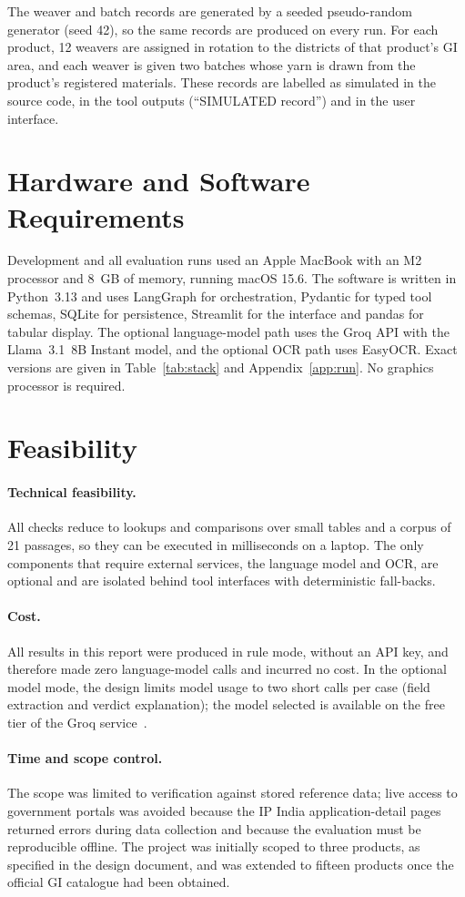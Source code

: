 The weaver and batch records are generated by a seeded pseudo-random generator (seed 42), so the same
records are produced on every run. For each product, 12 weavers are assigned in rotation to the
districts of that product's GI area, and each weaver is given two batches whose yarn is drawn from the
product's registered materials. These records are labelled as simulated in the source code, in the
tool outputs (``SIMULATED record'') and in the user interface.

\section{Hardware and Software Requirements}

Development and all evaluation runs used an Apple MacBook with an M2 processor and 8~GB of memory,
running macOS 15.6. The software is written in Python~3.13 and uses LangGraph for orchestration,
Pydantic for typed tool schemas, SQLite for persistence, Streamlit for the interface and pandas for
tabular display. The optional language-model path uses the Groq API with the Llama~3.1~8B Instant
model, and the optional OCR path uses EasyOCR. Exact versions are given in Table~\ref{tab:stack} and
Appendix~\ref{app:run}. No graphics processor is required.

\section{Feasibility}

\paragraph{Technical feasibility.} All checks reduce to lookups and comparisons over small tables and a
corpus of 21 passages, so they can be executed in milliseconds on a laptop. The only components that
require external services, the language model and OCR, are optional and are isolated behind tool
interfaces with deterministic fall-backs.

\paragraph{Cost.} All results in this report were produced in rule mode, without an API key, and
therefore made zero language-model calls and incurred no cost. In the optional model mode, the design
limits model usage to two short calls per case (field extraction and verdict explanation); the model
selected is available on the free tier of the Groq service~\cite{groq}.

\paragraph{Time and scope control.} The scope was limited to verification against stored reference data;
live access to government portals was avoided because the IP India application-detail pages returned
errors during data collection and because the evaluation must be reproducible offline. The project
was initially scoped to three products, as specified in the design document, and was extended to
fifteen products once the official GI catalogue had been obtained.
